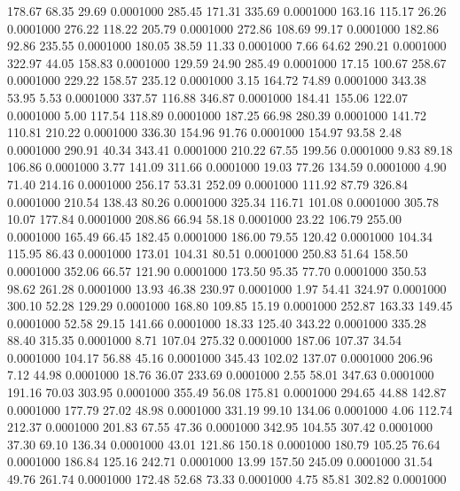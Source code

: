  178.67   68.35   29.69   0.0001000
 285.45  171.31  335.69   0.0001000
 163.16  115.17   26.26   0.0001000
 276.22  118.22  205.79   0.0001000
 272.86  108.69   99.17   0.0001000
 182.86   92.86  235.55   0.0001000
 180.05   38.59   11.33   0.0001000
   7.66   64.62  290.21   0.0001000
 322.97   44.05  158.83   0.0001000
 129.59   24.90  285.49   0.0001000
  17.15  100.67  258.67   0.0001000
 229.22  158.57  235.12   0.0001000
   3.15  164.72   74.89   0.0001000
 343.38   53.95    5.53   0.0001000
 337.57  116.88  346.87   0.0001000
 184.41  155.06  122.07   0.0001000
   5.00  117.54  118.89   0.0001000
 187.25   66.98  280.39   0.0001000
 141.72  110.81  210.22   0.0001000
 336.30  154.96   91.76   0.0001000
 154.97   93.58    2.48   0.0001000
 290.91   40.34  343.41   0.0001000
 210.22   67.55  199.56   0.0001000
   9.83   89.18  106.86   0.0001000
   3.77  141.09  311.66   0.0001000
  19.03   77.26  134.59   0.0001000
   4.90   71.40  214.16   0.0001000
 256.17   53.31  252.09   0.0001000
 111.92   87.79  326.84   0.0001000
 210.54  138.43   80.26   0.0001000
 325.34  116.71  101.08   0.0001000
 305.78   10.07  177.84   0.0001000
 208.86   66.94   58.18   0.0001000
  23.22  106.79  255.00   0.0001000
 165.49   66.45  182.45   0.0001000
 186.00   79.55  120.42   0.0001000
 104.34  115.95   86.43   0.0001000
 173.01  104.31   80.51   0.0001000
 250.83   51.64  158.50   0.0001000
 352.06   66.57  121.90   0.0001000
 173.50   95.35   77.70   0.0001000
 350.53   98.62  261.28   0.0001000
  13.93   46.38  230.97   0.0001000
   1.97   54.41  324.97   0.0001000
 300.10   52.28  129.29   0.0001000
 168.80  109.85   15.19   0.0001000
 252.87  163.33  149.45   0.0001000
  52.58   29.15  141.66   0.0001000
  18.33  125.40  343.22   0.0001000
 335.28   88.40  315.35   0.0001000
   8.71  107.04  275.32   0.0001000
 187.06  107.37   34.54   0.0001000
 104.17   56.88   45.16   0.0001000
 345.43  102.02  137.07   0.0001000
 206.96    7.12   44.98   0.0001000
  18.76   36.07  233.69   0.0001000
   2.55   58.01  347.63   0.0001000
 191.16   70.03  303.95   0.0001000
 355.49   56.08  175.81   0.0001000
 294.65   44.88  142.87   0.0001000
 177.79   27.02   48.98   0.0001000
 331.19   99.10  134.06   0.0001000
   4.06  112.74  212.37   0.0001000
 201.83   67.55   47.36   0.0001000
 342.95  104.55  307.42   0.0001000
  37.30   69.10  136.34   0.0001000
  43.01  121.86  150.18   0.0001000
 180.79  105.25   76.64   0.0001000
 186.84  125.16  242.71   0.0001000
  13.99  157.50  245.09   0.0001000
  31.54   49.76  261.74   0.0001000
 172.48   52.68   73.33   0.0001000
   4.75   85.81  302.82   0.0001000
